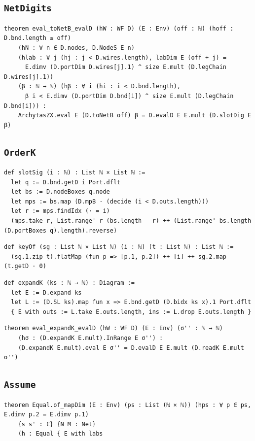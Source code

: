 \subsection{\texttt{NetDigits}}
\begin{lstlisting}[style=leancore]
theorem eval_toNetB_evalD (hW : WF D) (E : Env) (off : ℕ) (hoff : D.bnd.length ≤ off)
    (hN : ∀ n ∈ D.nodes, D.NodeS E n)
    (hlab : ∀ j (hj : j < D.wires.length), labDim E (off + j) =
      E.dimv (D.portDim D.wires[j].1) ^ size E.mult (D.legChain D.wires[j].1))
    (β : ℕ → ℕ) (hβ : ∀ i (hi : i < D.bnd.length),
      β i < E.dimv (D.portDim D.bnd[i]) ^ size E.mult (D.legChain D.bnd[i])) :
    ArchytasZX.eval E (D.toNetB off) β = D.evalD E E.mult (D.slotDig E β)
\end{lstlisting}

\subsection{\texttt{OrderK}}
\begin{lstlisting}[style=leancore]
def slotSig (i : ℕ) : List ℕ × List ℕ :=
  let q := D.bnd.getD i Port.dflt
  let bs := D.nodeBoxes q.node
  let mps := bs.map (D.mpB · (decide (i < D.outs.length)))
  let r := mps.findIdx (· = i)
  (mps.take r, List.range' r (bs.length - r) ++ (List.range' bs.length (D.portBoxes q).length).reverse)
\end{lstlisting}
\begin{lstlisting}[style=leancore]
def keyOf (sg : List ℕ × List ℕ) (i : ℕ) (t : List ℕ) : List ℕ :=
  (sg.1.zip t).flatMap (fun p => [p.1, p.2]) ++ [i] ++ sg.2.map (t.getD · 0)
\end{lstlisting}
\begin{lstlisting}[style=leancore]
def expandK (ks : ℕ → ℕ) : Diagram :=
  let E := D.expand ks
  let L := (D.SL ks).map fun x => E.bnd.getD (D.bidx ks x).1 Port.dflt
  { E with outs := L.take E.outs.length, ins := L.drop E.outs.length }
\end{lstlisting}
\begin{lstlisting}[style=leancore]
theorem eval_expandK_evalD (hW : WF D) (E : Env) (σ'' : ℕ → ℕ)
    (hσ : (D.expandK E.mult).InRange E σ'') :
    (D.expandK E.mult).eval E σ'' = D.evalD E E.mult (D.readK E.mult σ'')
\end{lstlisting}

\subsection{\texttt{Assume}}
\begin{lstlisting}[style=leancore]
theorem Equal.of_mapDim (E : Env) (ps : List (ℕ × ℕ)) (hps : ∀ p ∈ ps, E.dimv p.2 = E.dimv p.1)
    {s s' : ℂ} {N M : Net}
    (h : Equal { E with labs
\end{lstlisting}

